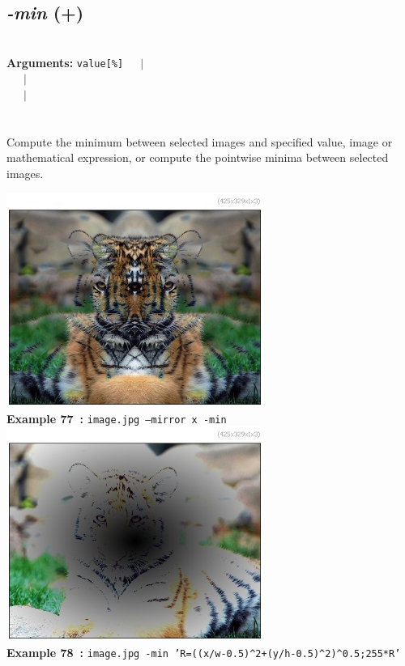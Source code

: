 \documentclass[a4paper,11pt,twoside]{book}
\begin{document}
\subsection{\emph{-min} (+)}\vspace*{-0.5em}
~\\\textbf{Arguments: } 
{\small \texttt{value[\%]}}~~~$|$\\
\hspace*{2.2cm}{\small \texttt{[image]}}~~~$|$\\
~~~$|$\\
\\~\\
Compute the minimum between selected images and specified value, image or
mathematical expression, or compute the pointwise minima between selected images.
\begin{center}\includegraphics[keepaspectratio=true,height=7cm,width=\textwidth]{img/gmic_def77.jpg}\\
{\footnotesize \textbf{Example 77~:} \texttt{image.jpg --mirror x -min}}
\\\includegraphics[keepaspectratio=true,height=7cm,width=\textwidth]{img/gmic_def78.jpg}\\
{\footnotesize \textbf{Example 78~:} \texttt{image.jpg -min 'R=((x/w-0.5)\textasciicircum 2+(y/h-0.5)\textasciicircum 2)\textasciicircum 0.5;255*R'}}
\end{center}
\end{document}
